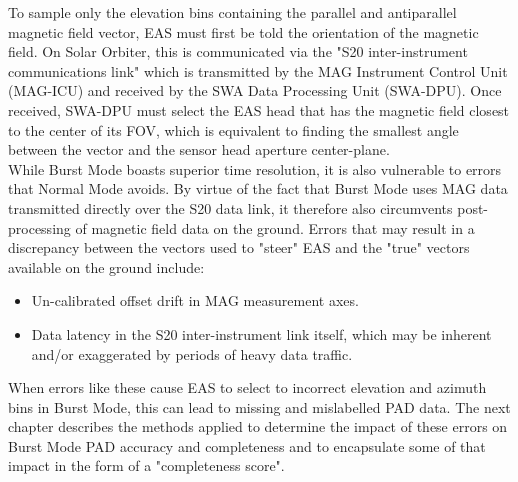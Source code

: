 To sample only the elevation bins containing the parallel and antiparallel magnetic field vector, EAS must first be told the orientation of the magnetic field. On Solar Orbiter, this is communicated via the "S20 inter-instrument communications link" which is transmitted by the MAG Instrument Control Unit (MAG-ICU) and received by the SWA Data Processing Unit (SWA-DPU)\cite{owen2021}\cite{owen2020}\cite{horbury2020}. Once received, SWA-DPU must select the EAS head that has the magnetic field closest to the center of its FOV, which is equivalent to finding the smallest angle between the vector and the sensor head aperture center-plane\cite{owen2021}.
\\

While Burst Mode boasts superior time resolution, it is also vulnerable to errors that Normal Mode avoids. By virtue of the fact that Burst Mode uses MAG data transmitted directly over the S20 data link, it therefore also circumvents post-processing of magnetic field data on the ground. Errors that may result in a discrepancy between the vectors used to "steer" EAS and the "true" vectors available on the ground include: 
\begin{itemize}
    \item Un-calibrated offset drift in MAG measurement axes\cite{owen2021}\cite{horbury2020}. 
    \item Data latency in the S20 inter-instrument link itself, which may be inherent and/or exaggerated  by periods  of heavy data traffic\cite{owen2021}.
\end{itemize}

When errors like these cause EAS to select to incorrect elevation and azimuth bins in Burst Mode, this can lead to missing and mislabelled PAD data. The next chapter describes the methods applied to determine the impact of these errors on Burst Mode PAD accuracy and completeness and to encapsulate some of that impact in the form of a "completeness score".

